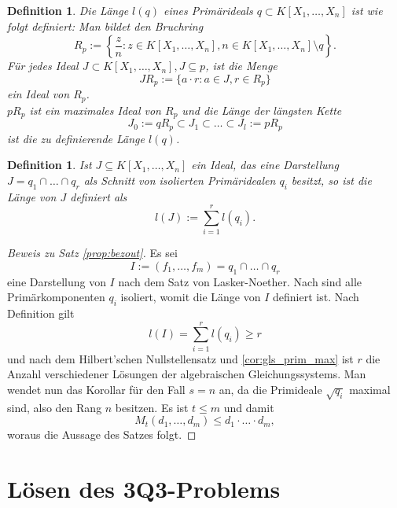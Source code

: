 \documentclass[a4paper,oneside, 11pt, openany%
]{article}
\newcommand{\coloneqq}{:=}
\theoremstyle{custom}
\theoremstyle{custom}
\newtheorem{definition}[theorem]{Definition}
\begin{document}
	\begin{definition}
		Die Länge $l(q)$ eines Primärideals $q \subset K[X_1,\ldots,X_n]$ ist wie folgt definiert: Man bildet den Bruchring \[R_p \coloneqq \left\lbrace \frac{z}{n} \colon z \in  K[X_1,\ldots,X_n], n \in  K[X_1,\ldots,X_n] \setminus q \right\rbrace.\]
		Für jedes Ideal $J \subset K[X_1,\ldots,X_n], J \subseteq p$, ist die Menge \[JR_p \coloneqq \{a\cdot r \colon a \in J, r \in R_p\}\]
		ein Ideal von $R_p$.\\
		$pR_p$ ist ein maximales Ideal von $R_p$ und die Länge der längsten Kette \[J_0 \coloneqq qR_p \subset J_1 \subset \ldots \subset J_l \coloneqq pR_p\] ist die zu definierende Länge $l(q)$.
	\end{definition}
	\begin{definition}
		Ist $J \subseteq K[X_1,\ldots,X_n]$ ein Ideal, das eine Darstellung $J = q_1 \cap \ldots \cap q_r$ als Schnitt von isolierten Primäridealen $q_i$ besitzt, so ist die Länge von $J$ definiert als \[l(J) \coloneqq \sum_{i=1}^{r} l(q_i).\]
	\end{definition}
	\begin{proof}[Beweis zu Satz \ref{prop:bezout}]
		Es sei \[I \coloneqq (f_1, \ldots, f_m) = q_1 \cap \ldots \cap q_r\] eine Darstellung von $I$ nach dem Satz von Lasker-Noether. Nach sind alle Primärkomponenten $q_i$ isoliert, womit die Länge von $I$ definiert ist. Nach Definition gilt \[l(I) = \sum_{i=1}^{r} l(q_i)\geq r\] und nach dem Hilbert'schen Nullstellensatz und \ref{cor:gls_prim_max} ist $r$ die Anzahl verschiedener Lösungen der algebraischen Gleichungssystems. Man wendet nun das Korollar für den Fall $s=n$ an, da die Primideale $\sqrt{q_i}$ maximal sind, also den Rang $n$ besitzen. Es ist $t \leq m$ und damit \[M_t(d_1, \ldots, d_m) \leq d_1 \cdot \ldots \cdot d_m,\] woraus die Aussage des Satzes folgt.
	\end{proof}
	\newpage
	\section{Lösen des 3Q3-Problems}\label{chp:3Q3}

	
\end{document}
